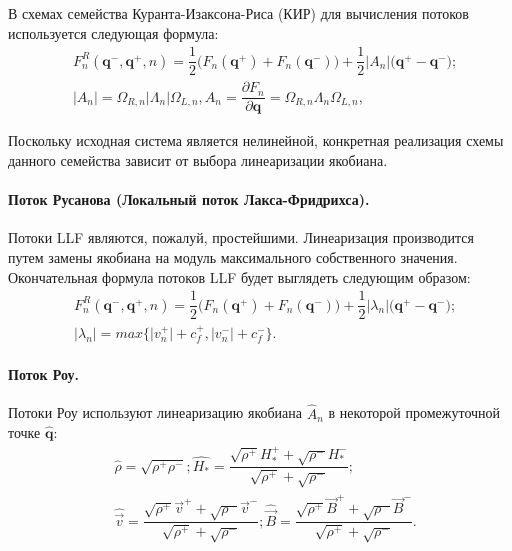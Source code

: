 \documentclass[14pt, a4paper, fleqn]{extreport}
\begin{document}
	В схемах семейства Куранта-Изаксона-Риса (КИР) 
	для вычисления потоков используется следующая формула:
	\begin{equation*}
	\begin{split}
		&F_{n}^R(\textbf{q}^{-},\textbf{q}^{+},n) 
			= \dfrac{1}{2}\Big( F_n(\textbf{q}^{+}) + F_n(\textbf{q}^{-}) \Big)
			+ \dfrac{1}{2}\big|A_n\big| \Big( \textbf{q}^{+} - \textbf{q}^{-} \Big); \\
		&\big|A_n\big| = \Omega_{R,n}\big|\Lambda_{n}\big|\Omega_{L,n},
		 A_n = \dfrac{\partial F_n}{\partial \textbf{q}} = \Omega_{R,n}\Lambda_{n}\Omega_{L,n},
	\end{split}
	\end{equation*}
	
	Поскольку исходная система является нелинейной, 
	конкретная реализация схемы данного семейства зависит от выбора линеаризации якобиана.
	
	\paragraph{Поток Русанова (Локальный поток Лакса-Фридрихса).}
	
	Потоки LLF являются, пожалуй, простейшими.
	Линеаризация производится путем замены якобиана на модуль максимального собственного значения.
	Окончательная формула потоков LLF будет выглядеть следующим образом:
	\begin{equation*}
	\begin{split}
		&F_{n}^R(\textbf{q}^{-},\textbf{q}^{+},n) 
			= \dfrac{1}{2}\Big( F_n(\textbf{q}^{+}) + F_n(\textbf{q}^{-}) \Big)
			+ \dfrac{1}{2}\big|\lambda_n\big| \Big( \textbf{q}^{+} - \textbf{q}^{-} \Big); \\
		&\big|\lambda_n\big| = max\Big\lbrace \big|v^{+}_n\big|+c^{+}_f, \big|v^{-}_n\big|+c^{-}_f \Big\rbrace.
	\end{split}
	\end{equation*}

	\paragraph{Поток Роу.}
	
	Потоки Роу используют линеаризацию якобиана $\hat{A}_n$ в некоторой промежуточной точке $\hat{\textbf{q}}$:
	\begin{equation*}
	\begin{split}
		&\hat{\rho} = \sqrt{\rho^{+}\rho^{-}};
		 \hat{H_*} = \dfrac{\sqrt{\rho^{+}}H_*^{+} + 
						    \sqrt{\rho^{-}}H_*^{-}}{\sqrt{\rho^{+}} + \sqrt{\rho^{-}}}; \\
		&\hat{\vec{v}} = \dfrac{\sqrt{\rho^{+}}\vec{v}^{+} + 
			                    \sqrt{\rho^{-}}\vec{v}^{-}}{\sqrt{\rho^{+}} + \sqrt{\rho^{-}}};
		 \hat{\vec{B}} = \dfrac{\sqrt{\rho^{+}}\vec{B}^{+} + 
							    \sqrt{\rho^{-}}\vec{B}^{-}}{\sqrt{\rho^{+}} + \sqrt{\rho^{-}}}.
	\end{split}
	\end{equation*}
	
\end{document}
